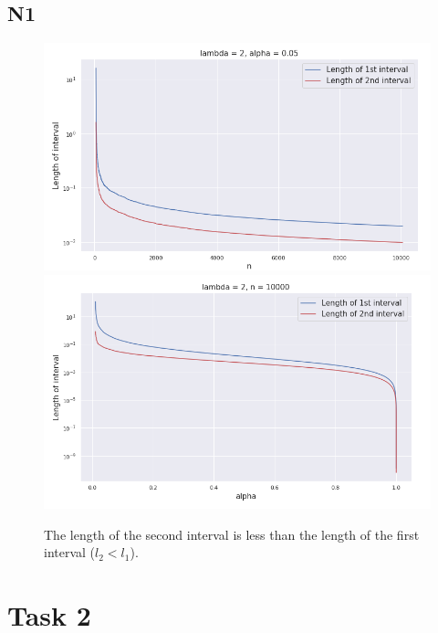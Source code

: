 \documentclass[a4paper, 12pt]{article}
\begin{document}
\subsection*{N1}
\begin{figure}[H]
\includegraphics[width=\textwidth]{Images/1_1_2.png}
\includegraphics[width=\textwidth]{Images/1_2_1.png}
\caption{The length of the second interval is less than the length of the first interval ($l_2 < l_1$).}
\end{figure}

\section{Task 2}
\end{document}
